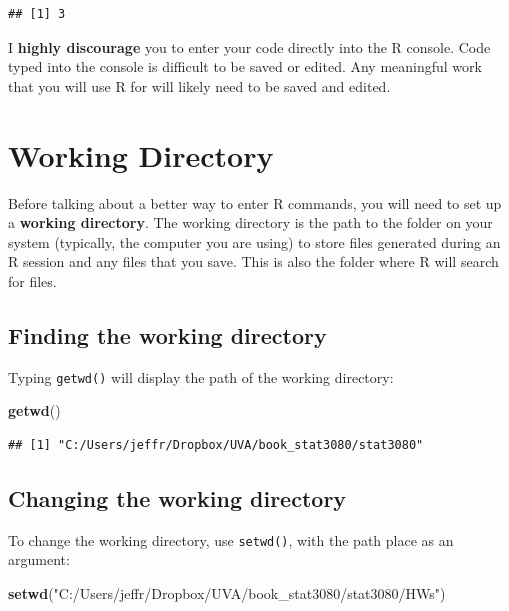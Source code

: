 \documentclass[
]{book}
\newenvironment{Shaded}{\begin{snugshade}}{\end{snugshade}}
\newcommand{\FunctionTok}[1]{\textcolor[rgb]{0.13,0.29,0.53}{\textbf{#1}}}
\newcommand{\NormalTok}[1]{#1}
\newcommand{\StringTok}[1]{\textcolor[rgb]{0.31,0.60,0.02}{#1}}
\theoremstyle{definition}
\theoremstyle{definition}
\theoremstyle{definition}
\theoremstyle{definition}
\theoremstyle{remark}
\begin{document}
\begin{verbatim}
## [1] 3
\end{verbatim}

I \textbf{highly discourage} you to enter your code directly into the R console. Code typed into the console is difficult to be saved or edited. Any meaningful work that you will use R for will likely need to be saved and edited.

\hypertarget{wd}{%
\section{Working Directory}\label{wd}}

Before talking about a better way to enter R commands, you will need to set up a \textbf{working directory}. The working directory is the path to the folder on your system (typically, the computer you are using) to store files generated during an R session and any files that you save. This is also the folder where R will search for files.

\hypertarget{finding-the-working-directory}{%
\subsection{Finding the working directory}\label{finding-the-working-directory}}

Typing \texttt{getwd()} will display the path of the working directory:

\begin{Shaded}
\begin{Highlighting}[]
\FunctionTok{getwd}\NormalTok{()}
\end{Highlighting}
\end{Shaded}

\begin{verbatim}
## [1] "C:/Users/jeffr/Dropbox/UVA/book_stat3080/stat3080"
\end{verbatim}

\hypertarget{changing-the-working-directory}{%
\subsection{Changing the working directory}\label{changing-the-working-directory}}

To change the working directory, use \texttt{setwd()}, with the path place as an argument:

\begin{Shaded}
\begin{Highlighting}[]
\FunctionTok{setwd}\NormalTok{(}\StringTok{"C:/Users/jeffr/Dropbox/UVA/book\_stat3080/stat3080/HWs"}\NormalTok{)}
\end{Highlighting}
\end{Shaded}
\end{document}
